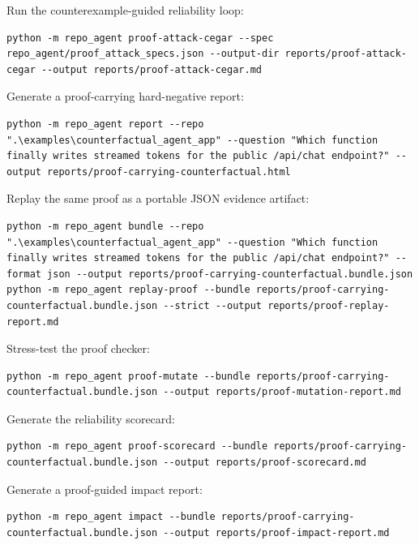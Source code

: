 \documentclass[UTF8,12pt,openany]{ctexbook}
\begin{document}
Run the counterexample-guided reliability loop:\par

\begin{lstlisting}
python -m repo_agent proof-attack-cegar --spec repo_agent/proof_attack_specs.json --output-dir reports/proof-attack-cegar --output reports/proof-attack-cegar.md
\end{lstlisting}

Generate a proof-carrying hard-negative report:\par

\begin{lstlisting}
python -m repo_agent report --repo ".\examples\counterfactual_agent_app" --question "Which function finally writes streamed tokens for the public /api/chat endpoint?" --output reports/proof-carrying-counterfactual.html
\end{lstlisting}

Replay the same proof as a portable JSON evidence artifact:\par

\begin{lstlisting}
python -m repo_agent bundle --repo ".\examples\counterfactual_agent_app" --question "Which function finally writes streamed tokens for the public /api/chat endpoint?" --format json --output reports/proof-carrying-counterfactual.bundle.json
python -m repo_agent replay-proof --bundle reports/proof-carrying-counterfactual.bundle.json --strict --output reports/proof-replay-report.md
\end{lstlisting}

Stress-test the proof checker:\par

\begin{lstlisting}
python -m repo_agent proof-mutate --bundle reports/proof-carrying-counterfactual.bundle.json --output reports/proof-mutation-report.md
\end{lstlisting}

Generate the reliability scorecard:\par

\begin{lstlisting}
python -m repo_agent proof-scorecard --bundle reports/proof-carrying-counterfactual.bundle.json --output reports/proof-scorecard.md
\end{lstlisting}

Generate a proof-guided impact report:\par

\begin{lstlisting}
python -m repo_agent impact --bundle reports/proof-carrying-counterfactual.bundle.json --output reports/proof-impact-report.md
\end{lstlisting}
\end{document}
